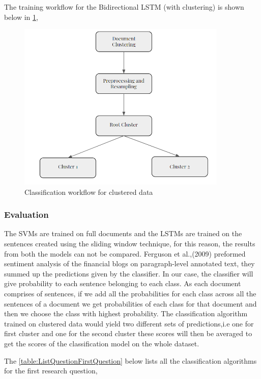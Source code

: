 The training workflow for the Bidirectional LSTM (with clustering) is shown below in \ref{fig:clusterFlowClassification}, 

\begin{figure}[!ht]
    \centering
    \includegraphics[width=10cm,keepaspectratio]{pics/clusterClassificationFlow.png}
    \caption{Classification workflow for clustered data}
    \label{fig:clusterFlowClassification}
\end{figure}

\subsubsection*{Evaluation} \label{evaluationQuestionOne}
The SVMs are trained on full documents and the LSTMs are trained on the sentences created using the  sliding window technique, for this reason, the results from both the models can not be compared. Ferguson et al.,(2009) \cite{ferguson2009exploring} preformed sentiment analysis of the financial blogs on paragraph-level 
annotated text, they summed up the predictions given by the classifier. In our case, the classifier will give probability to each sentence belonging to each class. As each document comprises of sentences, if we add all the probabilities for each class across all the sentences of a document we get probabilities of each class for that document and then we choose the class with highest probability. The classification algorithm trained on clustered data would yield two different sets of predictions,i.e one for first cluster and one for the second cluster these scores will then be averaged to get the scores of the classification model on the whole dataset.

The \ref{table:ListQuestionFirstQuestion} below lists all the classification algorithms for the first research question,

